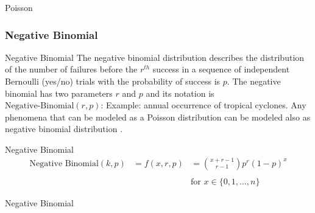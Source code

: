\begin{frame}[noframenumbering]{Poisson}
	\centering
\end{frame}

\subsubsection*{Negative Binomial}
\begin{frame}[noframenumbering]{Negative Binomial}
	\small
	The negative binomial distribution describes the distribution of the number of failures before the $r^{th}$ success in a sequence of independent Bernoulli (yes/no) trials with the probability of success is $p$.
	\vfill \small
	The negative binomial has two parameters $r$ and $p$ and its notation is
	$\text{Negative-Binomial}(r, p)$:
	\vfill \small
	Example: annual occurrence of tropical cyclones.
	\vfill 
	Any phenomena that can be modeled as a Poisson distribution can be modeled also as negative binomial distribution \parencite{gelman2013bayesian, gelman2020regression}.
\end{frame}

\begin{frame}[noframenumbering]{Negative Binomial}
	$$
		\begin{aligned}
			\text{Negative Binomial}(k, p) & = f(x, r, p) & = \binom{x + r - 1}{r - 1}p^{r}(1-p)^{x} \\
			\\
			                               & ~            & \text{for $x \in \{0, 1, \dots, n\}$}
		\end{aligned}
	$$
\end{frame}

\begin{frame}[noframenumbering]{Negative Binomial}
	\centering
\end{frame}


